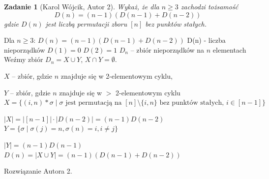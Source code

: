 \documentclass{mwart}
\newtheorem{zad}{Zadanie}[section]
\begin{document}
\begin{zad}[Karol Wójcik, Autor 2]
    Wykaż, że dla $n \geq 3$ zachodzi tożsamość
    \[
        D(n) = (n-1)(D(n-1) + D(n-2))
    \]
    gdzie $D(n)$ jest liczbą permutacji zboru $[n]$ bez punktów stałych.
\end{zad}
\begin{mdframed}
    Dla $n \ge 3$:   $D(n) = (n-1)(D(n-1)+D(n-2))$
\newline \newline
    D(n) - liczba nieporządków
\newline \newline
    $D(1) = 0$      $D(2) = 1$
\newline \newline
    $D_n$ -- zbiór nieporządków na $n$ elementach
    \newline \newline
    Weźmy zbiór $D_n = X \cup Y$, $X \cap Y = \emptyset$.

    $X$ -- zbiór, gdzie $n$ znajduje się w 2-elementowym cyklu, 

    $Y$ -- zbiór, gdzie $n$ znajduje się w $>$ 2-elementowym cyklu
    \newline \newline
    $X = \{ (i,n) \ast \sigma \mid \sigma \text{ jest permutacją na } [n] \setminus \{i,n\} \text{ bez punktów stałych, } i \in [n-1] \}$

    $|X| = \lvert [n-1] \rvert \cdot \lvert D(n-2) \rvert = (n-1)D(n-2)$
    \newline \newline
    $Y = \{ \sigma \mid \sigma(j)=n, \sigma(n)=i, i \neq j \}$

    $|Y| = (n-1)D(n-1)$
\newline \newline
$D(n) = |X \cup Y| = (n-1)(D(n-1) + D(n-2))$
\end{mdframed}
\begin{mdframed}
    Rozwiązanie Autora 2.
\end{mdframed}
\end{document}
